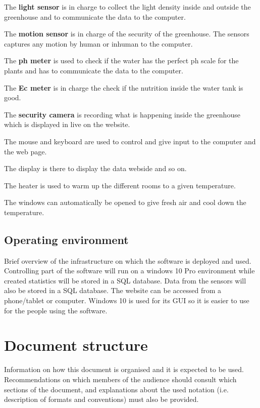 \noindent The \textbf{light sensor} is in charge to collect the light density
 inside and outside the greenhouse and to communicate the data to the computer.\break

\noindent The \textbf{motion sensor} is  in charge of the security of the
greenhouse. The sensors captures any motion by human or inhuman to the computer.\break

\noindent The \textbf{ph meter} is used to check if the water has the perfect ph
scale for the plants and has to communicate the data to the computer.\break

\noindent The \textbf{Ec meter} is in charge the check if the nutrition inside
the water tank is good.\break

\noindent The \textbf{security camera} is recording what is happening inside the
greenhouse which is displayed in live on the website.\break

\noindent The mouse and keyboard are used to control and give input to the
computer and the web page.

\noindent The display is there to display the data webside and so on.

\noindent The heater is used to warm up the different rooms to a given
temperature.

\noindent The windows can automatically be opened to give fresh air and cool
down the temperature.



\subsection{Operating environment}
Brief overview of the infrastructure on which the software is deployed and used.
Controlling part of the software will run on a windows 10 Pro environment while
created statistics will be stored in a SQL database. Data from the sensors will
also be stored in a SQL database. The website can be accessed from a
phone/tablet or computer. Windows 10 is used for its GUI so it is easier to use
for the people using the software.

\section{Document structure}  
Information on how this document is organised and it is expected to be
used. Recommendations on which members of the audience
should consult which sections of the document, and explanations about the used
notation (i.e. description of formats and conventions) must also be provided.
